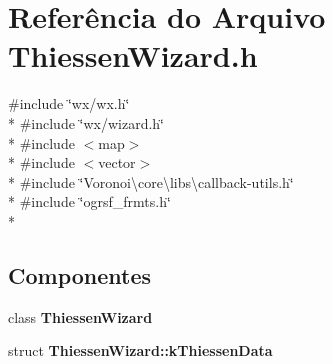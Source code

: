 \section{Referência do Arquivo Thiessen\+Wizard.\+h}
\label{_thiessen_wizard_8h}
{\ttfamily \#include \char`\"{}wx/wx.\+h\char`\"{}}\\*
{\ttfamily \#include \char`\"{}wx/wizard.\+h\char`\"{}}\\*
{\ttfamily \#include $<$map$>$}\\*
{\ttfamily \#include $<$vector$>$}\\*
{\ttfamily \#include \char`\"{}Voronoi\textbackslash{}core\textbackslash{}libs\textbackslash{}callback-\/utils.\+h\char`\"{}}\\*
{\ttfamily \#include \char`\"{}ogrsf\+\_\+frmts.\+h\char`\"{}}\\*
\subsection*{Componentes}
\begin{DoxyCompactItemize}
\item 
class {\bf Thiessen\+Wizard}
\item 
struct {\bf Thiessen\+Wizard\+::k\+Thiessen\+Data}
\end{DoxyCompactItemize}

